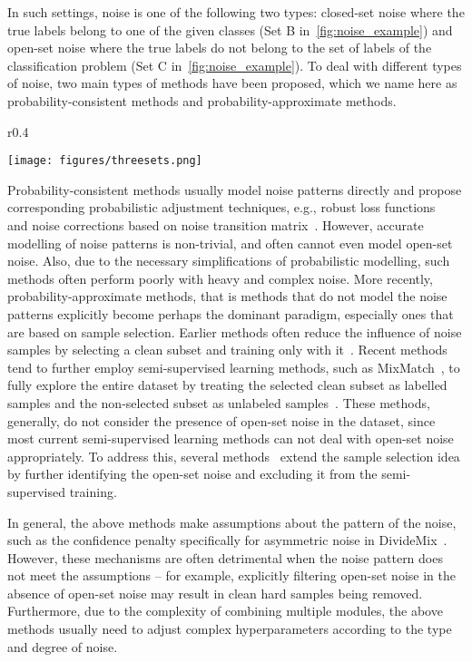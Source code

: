 \documentclass{bmvc2k}
\begin{document}
In such settings, noise is one of the following two types: closed-set noise where the true labels belong to one of the given classes (Set B in~\cref{fig:noise_example}) and open-set noise where the true labels do not belong to the set of labels of the classification problem (Set C in~\cref{fig:noise_example}). To deal with different types of noise, two main types of methods have been proposed, which we name here as probability-consistent methods and probability-approximate methods.
\begin{wrapfigure}{r}{0.4\textwidth}
\begin{center}
    \texttt{[image: figures/threesets.png]}
  \end{center}
    \caption{Different ``tigers''.}
\label{fig:noise_example}
\end{wrapfigure}
Probability-consistent methods usually model noise patterns directly and propose corresponding probabilistic adjustment techniques, e.g., robust loss functions~\citep{mae, generalized_cross_entropy, symmetric_cross_entropy} and noise corrections based on noise transition matrix~\citep{noiseadaptation}. However, accurate modelling of noise patterns is non-trivial, and often cannot even model open-set noise. Also, due to the necessary simplifications of probabilistic modelling, such methods often perform poorly with heavy and complex noise. 
More recently, probability-approximate methods, that is methods that do not model the noise patterns explicitly become perhaps the dominant paradigm, especially ones that are based on sample selection. Earlier methods often reduce the influence of noise samples by selecting a clean subset and training only with it~\citep{coteaching, coteaching+, mentornet, whentohow}. Recent methods tend to further employ semi-supervised learning methods, such as MixMatch~\citep{mixmatch}, to fully explore the entire dataset by treating the selected clean subset as labelled samples and the non-selected subset as unlabeled samples~\citep{dividemix, moit}. These methods, generally, do not consider the presence of open-set noise in the dataset, since most current semi-supervised learning methods can not deal with open-set noise appropriately. To address this, several methods~\citep{evidentialmix, ngc} extend the sample selection idea by further identifying the open-set noise and excluding it from the semi-supervised training. 

In general, the above methods make assumptions about the pattern of the noise, such as the confidence penalty specifically for asymmetric noise in DivideMix~\citep{dividemix}. However, these mechanisms are often detrimental when the noise pattern does not meet the assumptions -- for example, explicitly filtering open-set noise in the absence of open-set noise may result in clean hard samples being removed. Furthermore, due to the complexity of combining multiple modules, the above methods usually need to adjust complex hyperparameters according to the type and degree of noise. 
\end{document}
